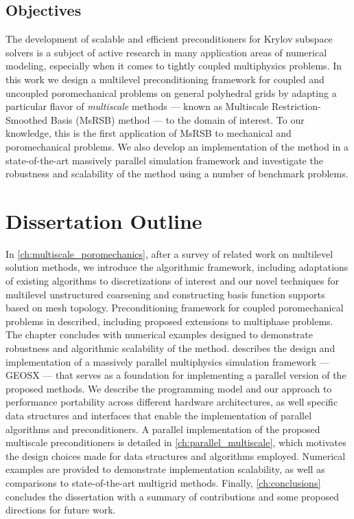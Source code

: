 \subsection{Objectives }
\label{subsec:intro_problem_objective}

The development of scalable and efficient preconditioners for Krylov subspace solvers is a subject of active research in many application areas of numerical modeling, especially when it comes to tightly coupled multiphysics problems.   In this work we design a multilevel preconditioning framework for coupled and uncoupled poromechanical problems on general polyhedral grids by adapting a particular flavor of \textit{multiscale} methods --- known as Multiscale Restriction-Smoothed Basis (MsRSB) method --- to the domain of interest.   To our knowledge, this is the first application of MsRSB to mechanical and poromechanical problems.   We also develop an implementation of the method in a state-of-the-art massively parallel simulation framework and investigate the robustness and scalability of the method using a number of benchmark problems.

\section{Dissertation Outline}
\label{sec:intro_outline}

In \cref{ch:multiscale_poromechanics}, after a survey of related work on multilevel solution methods, we introduce the algorithmic framework, including adaptations of existing algorithms to discretizations of interest and our novel techniques for multilevel unstructured coarsening and constructing basis function supports based on mesh topology.   Preconditioning framework for coupled poromechanical problems in described, including proposed extensions to multiphase problems.   The chapter concludes with numerical examples designed to demonstrate robustness and algorithmic scalability of the method.    describes the design and implementation of a massively parallel multiphysics simulation framework --- GEOSX --- that serves as a foundation for implementing a parallel version of the proposed methods.   We describe the programming model and our approach to performance portability across different hardware architectures, as well specific data structures and interfaces that enable the implementation of parallel algorithms and preconditioners.   A parallel implementation of the proposed multiscale preconditioners is detailed in \cref{ch:parallel_multiscale}, which motivates the design choices made for data structures and algorithms employed.   Numerical examples are provided to demonstrate implementation scalability, as well as comparisons to state-of-the-art multigrid methods.   Finally, \cref{ch:conclusions} concludes the dissertation with a summary of contributions and some proposed directions for future work.